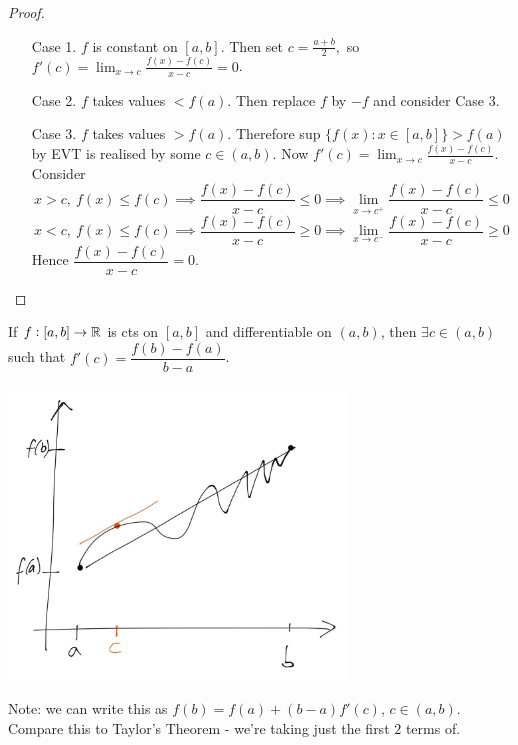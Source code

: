 \documentclass[twoside]{scrartcl}
\begin{document}
\begin{proof}~
\begin{enumerate}
\item[Case 1.] $f$ is constant on $[a,b]$. Then set $c = \frac{a+b}{2},$ so $f'(c) = \lim_{x\to c}\frac{f(x) - f(c)}{x-c} = 0$.
\item[Case 2.] $f$ takes values $< f(a)$. Then replace $f$ by $-f$ and consider Case 3.
\item[Case 3.] $f$ takes values $> f(a)$. Therefore sup $\{f(x): x \in [a,b]\} > f(a)$ by EVT is realised by some $c \in (a,b)$. Now $f'(c) = \lim_{x\to c} \frac{f(x) - f(c)}{x-c}$. Consider
 \[x > c,~f(x) \leq f(c) \implies \frac{f(x) - f(c)}{x-c} \leq 0 \implies \lim_{x \to c^{+}} \frac{f(x) - f(c)}{x-c} \leq 0\]
 \[x < c,~f(x) \leq f(c) \implies \frac{f(x) - f(c)}{x-c} \geq 0 \implies \lim_{x \to c^{-}} \frac{f(x) - f(c)}{x-c} \geq 0 \] 
 Hence  $\dfrac{f(x) - f(c)}{x-c} = 0$.\qedhere 
\end{enumerate}
	
\end{proof}
\pagebreak

\vspace*{5pt}


\begin{theorem}
If $f:[a,b] \to \mathbb{R}$ is cts on $[a,b]$ and differentiable on $(a,b)$, then $\exists c \in (a,b)$ such that $f'(c) = \dfrac{f(b) - f(a)}{b-a}$.
\end{theorem}


\begin{center}
\includegraphics[width = 9cm]{mvt1.jpg}
\end{center}
Note: we can write this as $f(b) = f(a) + (b-a)f'(c)$, $c \in (a,b)$. Compare this to Taylor's Theorem - we're taking just the first $2$ terms of.
\end{document}
